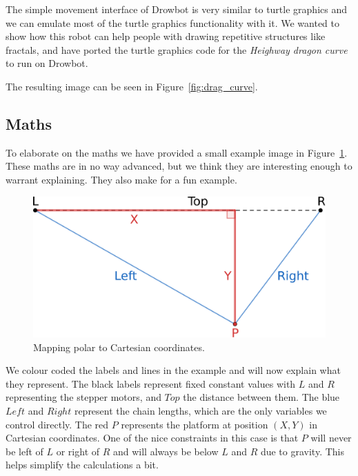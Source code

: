 \documentclass[a4paper,10pt]{article}
\begin{document}
The simple movement interface of Drowbot is very similar to
turtle graphics and we can emulate most of the turtle graphics
functionality with it.
We wanted to show how this robot can help people with drawing
repetitive structures like fractals, and have ported the turtle
graphics code for the \emph{Heighway dragon curve}\cite{dragon} to run on Drowbot.

The resulting image can be seen in Figure~\ref{fig:drag_curve}.


\subsection{Maths}

To elaborate on the maths we have provided a small example image
in Figure~\ref{fig:maths}.
These maths are in no way advanced, but we think they are interesting
enough to warrant explaining.
They also make for a fun example.

\begin{figure}[t]
  \centering
  \includegraphics[width=.5\textwidth]{img/drowbot-maths.eps}
  \caption{Mapping polar to Cartesian coordinates.}
  \label{fig:maths}
\end{figure}

We colour coded the labels and lines in the example and will now
explain what they represent.
The black labels represent fixed constant values with $L$ and $R$
representing the stepper motors, and $Top$ the distance between them.
The blue $Left$ and $Right$ represent the chain lengths, which are
the only variables we control directly.
The red $P$ represents the platform at position $(X,Y)$ in Cartesian
coordinates.
One of the nice constraints in this case is that $P$ will never be
left of $L$ or right of $R$ and will always be below $L$ and $R$ due
to gravity. This helps simplify the calculations a bit.
\end{document}
